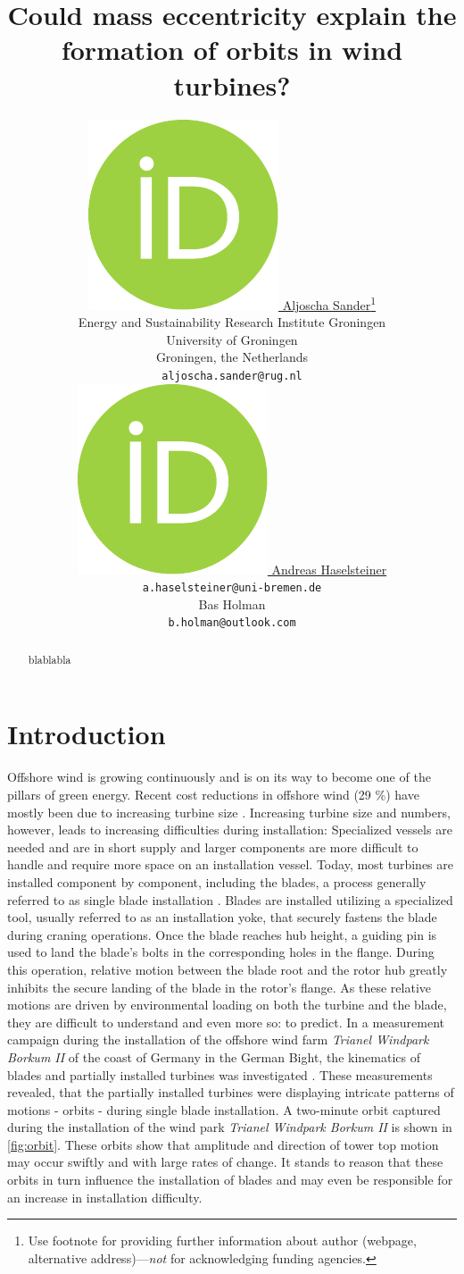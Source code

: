 \documentclass{article}
\title{Could mass eccentricity explain the formation of orbits in wind turbines?}
\author{ \href{https://orcid.org/0000-0000-0000-0000}{\includegraphics[scale=0.06]{orcid.pdf}\hspace{1mm} Aljoscha Sander}\thanks{Use footnote for providing further information about author (webpage, alternative address)---\emph{not} for acknowledging funding agencies.} \\
	Energy and Sustainability Research Institute Groningen\\
	University of Groningen\\
	Groningen, the Netherlands \\
	\texttt{aljoscha.sander@rug.nl} \\
	\And
	\href{https://orcid.org/0000-0000-0000-0000}{\includegraphics[scale=0.06]{orcid.pdf}\hspace{1mm} Andreas Haselsteiner} \\
	\texttt{a.haselsteiner@uni-bremen.de} \\
	\And
	Bas Holman \\
	\texttt{b.holman@outlook.com}\\
}
\begin{document}
\maketitle

\begin{abstract}
	blablabla
\end{abstract}




\section{Introduction}
\label{sec:introduction}

Offshore wind is growing continuously and is on its way to become one of the pillars of green energy. Recent cost reductions in offshore wind (29 \%) have mostly been due to increasing turbine size \citep{irenaRenewablePowerGeneration2020}. Increasing turbine size and numbers, however, leads to increasing difficulties during installation: Specialized vessels are needed and are in short supply and larger components are more difficult to handle and require more space on an installation vessel. Today, most turbines are installed component by component, including the blades, a process generally referred to as single blade installation \citep{jiangInstallationOffshoreWind2021}. Blades are installed utilizing a specialized tool, usually referred to as an installation yoke, that securely fastens the blade during craning operations. Once the blade reaches hub height, a guiding pin is used to land the blade's bolts in the corresponding holes in the flange. During this operation, relative motion between the blade root and the rotor hub greatly inhibits the secure landing of the blade in the rotor's flange. As these relative motions are driven by environmental loading on both the turbine and the blade, they are difficult to understand and even more so: to predict. 
In a measurement campaign during the installation of the offshore wind farm \textit{Trianel Windpark Borkum II} of the coast of Germany in the German Bight, the kinematics of blades and partially installed turbines was investigated \citep{sanderRelativeMotionSingle2020,  sanderMONITORINGOFFSHOREWIND2020, sanderOscillationsOffshoreWind2020}. These measurements revealed, that the partially installed turbines were displaying intricate patterns of motions - orbits - during single blade installation. A two-minute orbit captured during the installation of the wind park \textit{Trianel Windpark Borkum II} is shown in \autoref{fig:orbit}. These orbits show that amplitude and direction of tower top motion may occur swiftly and with large rates of change. It stands to reason that these orbits in turn influence the installation of blades and may even be responsible for an increase in installation difficulty.
\end{document}
